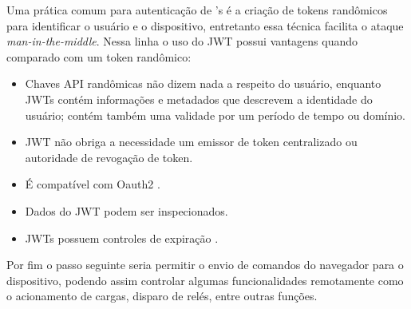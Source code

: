 Uma prática comum para autenticação de \iot's é a criação de tokens
randômicos para identificar o usuário e o dispositivo, entretanto essa
técnica facilita o ataque \emph{man-in-the-middle}. Nessa linha o uso do
JWT possui vantagens quando comparado com um token randômico:

\begin{itemize}
\itemsep1pt\parskip0pt
\item
  Chaves API randômicas não dizem nada a respeito do usuário, enquanto
  JWTs contém informações e metadados que descrevem a identidade do
  usuário; contém também uma validade por um período de tempo ou
  domínio.
\item
  JWT não obriga a necessidade um emissor de token centralizado ou
  autoridade de revogação de token.
\item
  É compatível com Oauth2 \cite{oauth2:2012}.
\item
  Dados do JWT podem ser inspecionados.
\item
  JWTs possuem controles de expiração \cite{romero:2015}.
\end{itemize}

Por fim o passo seguinte seria permitir o envio de comandos do navegador
para o dispositivo, podendo assim controlar algumas funcionalidades
remotamente como o acionamento de cargas, disparo de relés, entre outras
funções.

